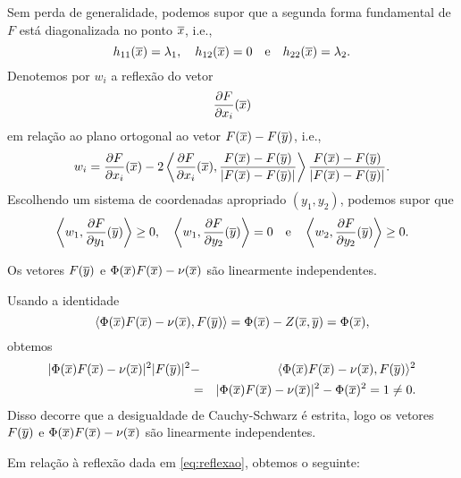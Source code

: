 \vspace{.2cm}

Sem perda de generalidade, podemos supor que a segunda forma
fundamental de $F$ est\'a diagonalizada no ponto $\overline{x}$, i.e.,
\[
h_{11}(\overline{x})=\lambda_1, \quad h_{12}(\overline{x}) = 0 \quad\mbox{e}\quad
h_{22}(\overline{x}) = \lambda_2.
\]
Denotemos por $w_i$ a reflex\~ao do vetor
\[
\frac{\partial F}{\partial x_i}(\overline{x})
\]
em rela\c c\~ao ao plano ortogonal ao vetor $F(\overline{x}) - F(\overline{y})$, i.e.,
\begin{eqnarray}\label{eq:reflexao}
w_i = \frac{\partial F}{\partial x_i}(\overline{x}) - 
2 \left\langle \frac{\partial F}{\partial x_i}(\overline{x}), \frac{F(\overline{x}) - 
	F(\overline{y})}{|F(\overline{x}) - F(\overline{y})|} \right\rangle \frac{F(\overline{x}) - 
	F(\overline{y})}{|F(\overline{x}) - F(\overline{y})|}.
\end{eqnarray}
Escolhendo um sistema de coordenadas apropriado $(y_1,y_2)$,
podemos supor que
\begin{equation*}
\left\langle w_1, \frac{\partial F}{\partial y_1}(\overline{y}) \right\rangle \geq 0, 
\quad 
\left\langle w_1, \frac{\partial F}{\partial y_2}(\overline{y}) \right\rangle = 0 
\quad \text{e} \quad 
\left\langle w_2, \frac{\partial F}{\partial y_2}(\overline{y}) \right\rangle \geq 0.
\end{equation*}


\begin{lema}
	Os vetores $F(\overline{y})$ e $ \Phi(\overline{x}) F(\overline{x}) - \nu(\overline{x}) $ são linearmente independentes.
\end{lema}

%	
\begin{demonstracao}
	Usando a identidade
	\[
	\langle \Phi(\overline{x}) F(\overline{x}) - \nu(\overline{x}), F(\overline{y}) \rangle = 
	\Phi(\overline{x}) - Z(\overline{x},\overline{y}) = \Phi(\overline{x}),
	\]
	obtemos
	\begin{eqnarray*}
		| \Phi(\overline{x}) F(\overline{x}) - \nu(\overline{x}) |^2 | F(\overline{y}) |^2 &-& 
		\langle \Phi(\overline{x}) F(\overline{x}) - \nu(\overline{x}), F(\overline{y}) \rangle^2 \\
		&=& | \Phi(\overline{x}) F(\overline{x}) - \nu(\overline{x}) |^2 - \Phi(\overline{x})^2 = 1 \neq 0.
	\end{eqnarray*}
	Disso decorre que a desigualdade de Cauchy-Schwarz \'e estrita,
	logo os vetores $F(\overline{y})$ e $\Phi(\overline{x})F(\overline{x})-\nu(\overline{x})$
	s\~ao linearmente independentes.
\end{demonstracao}
Em rela\c c\~ao \`a reflex\~ao dada em \eqref{eq:reflexao}, obtemos o
seguinte:

